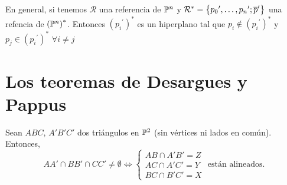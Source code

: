 \begin{obs}
En general, si tenemos $\mathcal{R}$ una referencia de $\mathbb{P}^n$ y
$\mathcal{R}^* = \left\{{p_0}^\prime,\dots,{p_n}^\prime; \overline{p}^\prime\right\}$
una refencia de $\left( \mathbb{P}^n \right)^*$. Entonces $\left( {p_i}^\prime \right)^*$
es un hiperplano tal que $p_i \notin \left( {p_i}^\prime \right)^*$ y
$p_j \in \left( {p_i}^\prime \right)^*$ $\forall i \neq j$
\end{obs}


\section{Los teoremas de Desargues y Pappus}

\begin{teo}[de Desargues]

Sean $ABC$, $A'B'C'$ dos triángulos en $\mathbb{P}^2$ (sin vértices ni lados en común). Entonces,
\[
AA' \cap BB' \cap CC' \neq \emptyset \iff
\begin{cases}
AB \cap A'B' = Z \\
AC \cap A'C' = Y \\
BC \cap B'C' = X
\end{cases}
\text{ están alineados.}
\]


\end{teo}
